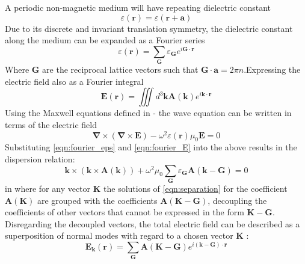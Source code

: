 A periodic non-magnetic medium will have repeating dielectric constant 
\begin{equation}
	\varepsilon(\boldsymbol{r}) = \varepsilon(\boldsymbol{r}+\boldsymbol{a})  
\end{equation}
Due to its discrete and invariant translation symmetry, the dielectric constant along the medium can be expanded as a Fourier series
\begin{equation}
	\varepsilon(\boldsymbol{r}) = \sum_{\boldsymbol{G}}\varepsilon_{\boldsymbol{G}}e^{i\boldsymbol{G}\cdot\boldsymbol{r}}  
	\label{eqn:fourier_eps}
\end{equation}
Where $\boldsymbol{G}$ are the reciprocal lattice vectors such that $\boldsymbol{G}\cdot\boldsymbol{a} = 2\pi n$.Expressing the electric field also as a Fourier integral
\begin{equation}
	\boldsymbol{E}(\boldsymbol{r}) = \iiint d^3\boldsymbol{k}\boldsymbol{A}(\boldsymbol{k})e^{i\boldsymbol{k}\cdot\boldsymbol{r}}
	\label{eqn:fourier_E}
\end{equation}
 Using the Maxwell equations defined in - the wave equation can be written in terms of the electric field 
\begin{equation}
	\boldsymbol{\nabla}\times(\boldsymbol{\nabla}\times\boldsymbol{E})-\omega^2\varepsilon(\boldsymbol{r})\mu_0\boldsymbol{E} = 0
\end{equation}
Substituting \eqref{eqn:fourier_eps} and \eqref{eqn:fourier_E} into the above results in the dispersion relation:
\begin{equation}
	\boldsymbol{k}\times(\boldsymbol{k}\times\boldsymbol{A}(\boldsymbol{k})) + \omega^2\mu_0\sum_{\boldsymbol{G}}\varepsilon_{\boldsymbol{G}}\boldsymbol{A}(\boldsymbol{k}-\boldsymbol{G}) = 0
	\label{eqn:separation}
\end{equation}
in where for any vector $\boldsymbol{K}$ the solutions of \eqref{eqn:separation} for the coefficient $\boldsymbol{A}(\boldsymbol{K})$ are grouped with the coefficients $\boldsymbol{A}(\boldsymbol{K}-\boldsymbol{G})$, decoupling the coefficients of other vectors that cannot be expressed in the form $\boldsymbol{K}-\boldsymbol{G}$. Disregarding the decoupled vectors, the total electric field can be described as a superposition of normal modes with regard to a chosen vector $\boldsymbol{K}$ :
\begin{equation}
	\boldsymbol{E}_{\boldsymbol{k}}(\boldsymbol{r}) = \sum_{\boldsymbol{G}}\boldsymbol{A}(\boldsymbol{K}-\boldsymbol{G})e^{i(\boldsymbol{k}-\boldsymbol{G})\cdot \boldsymbol{r}}
	\label{eqn:normalmodes}
\end{equation}
